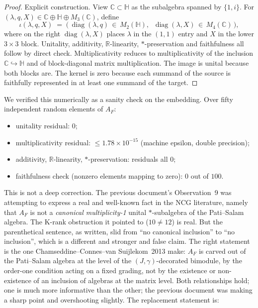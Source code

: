 \documentclass[11pt,a4paper]{article}
\begin{document}
\begin{proof}
Explicit construction. View $\mathbb{C} \subset \mathbb{H}$ as the subalgebra
spanned by $\{1, i\}$. For $(\lambda, q, X) \in \mathbb{C} \oplus \mathbb{H}
\oplus M_3(\mathbb{C})$, define
\[
  \iota(\lambda, q, X) \;=\;
  \Big(\, \operatorname{diag}(\lambda, q) \,\in\, M_2(\mathbb{H}),
        \;\; \operatorname{diag}(\lambda, X) \,\in\, M_4(\mathbb{C}) \,\Big),
\]
where on the right $\operatorname{diag}(\lambda, X)$ places $\lambda$ in the
$(1,1)$ entry and $X$ in the lower $3 \times 3$ block. Unitality, additivity,
$\mathbb{R}$-linearity, $*$-preservation and faithfulness all follow by direct
check. Multiplicativity reduces to multiplicativity of the inclusion
$\mathbb{C} \hookrightarrow \mathbb{H}$ and of block-diagonal matrix
multiplication. The image is unital because both blocks are. The kernel is zero
because each summand of the source is faithfully represented in at least one
summand of the target.
\end{proof}

We verified this numerically as a sanity check on the embedding. Over fifty
independent random elements of $A_F$:
\begin{itemize}[leftmargin=2em]
  \item unitality residual: $0$;
  \item multiplicativity residual: $\le 1.78 \times 10^{-15}$
        (machine epsilon, double precision);
  \item additivity, $\mathbb{R}$-linearity, $*$-preservation: residuals all $0$;
  \item faithfulness check (nonzero elements mapping to zero):
        $0$ out of $100$.
\end{itemize}

This is not a deep correction. The previous document's Observation~9 was
attempting to express a real and well-known fact in the NCG literature, namely
that $A_F$ is not a \emph{canonical multiplicity-1} unital $*$-subalgebra of the
Pati--Salam algebra. The K-rank obstruction it pointed to ($10 \neq 12$) is
real. But the parenthetical sentence, as written, slid from ``no canonical
inclusion'' to ``no inclusion'', which is a different and stronger and false
claim. The right statement is the one Chamseddine--Connes--van Suijlekom~2013
make: $A_F$ is carved out of the Pati--Salam algebra at the level of the
$(J,\gamma)$-decorated bimodule, by the order-one condition acting on a fixed
grading, not by the existence or non-existence of an inclusion of algebras at
the matrix level. Both relationships hold; one is much more informative than
the other; the previous document was making a sharp point and overshooting
slightly. The replacement statement is:
\end{document}
